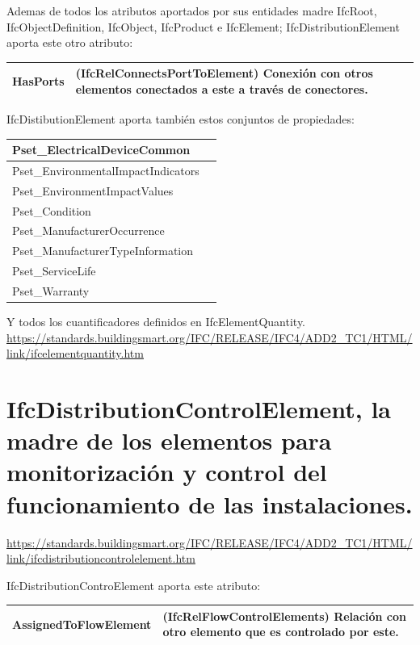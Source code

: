 \documentclass[spanish,12pt,a4paper,final,oneside]{book}
\begin{document}
Ademas de todos los atributos aportados por sus entidades madre IfcRoot, IfcObjectDefinition, IfcObject, IfcProduct e IfcElement; IfcDistributionElement aporta este otro atributo: 
\\ \begin{longtable}{|p{3cm} p{10cm}|}
\hline
HasPorts & (IfcRelConnectsPortToElement) Conexión con otros elementos conectados a este a través de conectores.
\\[0.1cm] \hline
\end{longtable}

IfcDistibutionElement aporta también estos conjuntos de propiedades:
\\ \begin{longtable}{|p{3cm} p{10cm}|}
\hline
Pset\_ElectricalDeviceCommon & 
\\[0.1cm] \hline
Pset\_EnvironmentalImpactIndicators & 
\\[0.1cm] \hline
Pset\_EnvironmentImpactValues & 
\\[0.1cm] \hline
Pset\_Condition & 
\\[0.1cm] \hline
Pset\_ManufacturerOccurrence & 
\\[0.1cm] \hline
Pset\_ManufacturerTypeInformation & 
\\[0.1cm] \hline
Pset\_ServiceLife & 
\\[0.1cm] \hline
Pset\_Warranty & 
\\[0.1cm] \hline
\end{longtable}

Y todos los cuantificadores definidos en IfcElementQuantity.
\\ \url{https://standards.buildingsmart.org/IFC/RELEASE/IFC4/ADD2_TC1/HTML/link/ifcelementquantity.htm}


\section{IfcDistributionControlElement, la madre de los elementos para monitorización y control del funcionamiento de las instalaciones.}
\url{https://standards.buildingsmart.org/IFC/RELEASE/IFC4/ADD2_TC1/HTML/link/ifcdistributioncontrolelement.htm}

IfcDistributionControElement aporta este atributo: 
\\ \begin{longtable}{|p{4cm} p{9cm}|}
\hline
AssignedToFlowElement & (IfcRelFlowControlElements) Relación con otro elemento que es controlado por este.
\\[0.1cm] \hline
\end{longtable}
\end{document}
